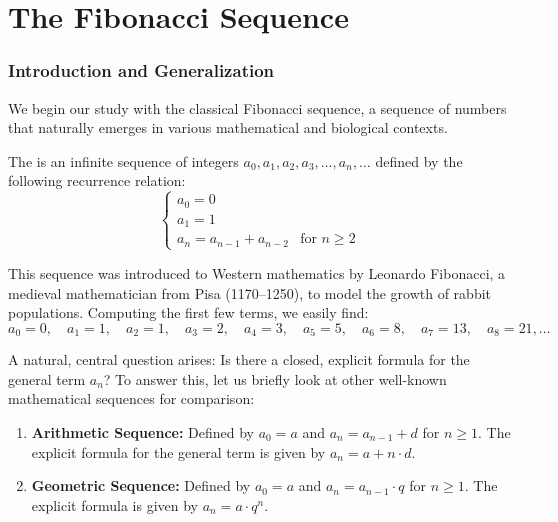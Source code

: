 \setcounter{chapter}{0}
\renewcommand{\thetheorem}{\thechapter.\arabic{theorem}}
\setcounter{theorem}{0}

\chapter{The Fibonacci Sequence}
\subsection{Introduction and Generalization}

We begin our study with the classical Fibonacci sequence, a sequence of numbers that naturally emerges in various mathematical and biological contexts.

\begin{definition}
The  is an infinite sequence of integers $a_0, a_1, a_2, a_3, \dots, a_n, \dots$ defined by the following recurrence relation:
\begin{equation} \label{eq:standard_fib_recurrence}
\begin{cases}
a_0 = 0 \\
a_1 = 1 \\
a_n = a_{n-1} + a_{n-2} & \text{for } n \ge 2
\end{cases}
\end{equation}
\end{definition}

\begin{remark}
This sequence was introduced to Western mathematics by Leonardo Fibonacci, a medieval mathematician from Pisa (1170--1250), to model the growth of rabbit populations. Computing the first few terms, we easily find:
\[
a_0 = 0, \quad a_1 = 1, \quad a_2 = 1, \quad a_3 = 2, \quad a_4 = 3, \quad a_5 = 5, \quad a_6 = 8, \quad a_7 = 13, \quad a_8 = 21, \dots
\]
\end{remark}

A natural, central question arises: Is there a closed, explicit formula for the general term $a_n$? To answer this, let us briefly look at other well-known mathematical sequences for comparison:
\begin{enumerate}
    \item \textbf{Arithmetic Sequence:} Defined by $a_0 = a$ and $a_n = a_{n-1} + d$ for $n \ge 1$. The explicit formula for the general term is given by $a_n = a + n \cdot d$.
    \item \textbf{Geometric Sequence:} Defined by $a_0 = a$ and $a_n = a_{n-1} \cdot q$ for $n \ge 1$. The explicit formula is given by $a_n = a \cdot q^n$.
\end{enumerate}

